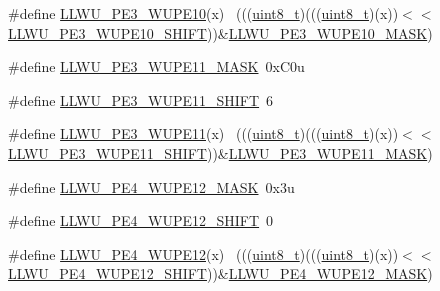 \begin{DoxyCompactItemize}
\#define \hyperlink{group___l_l_w_u___register___masks_ga08307363da95dd3aef24ec6c32a04f81}{L\+L\+W\+U\+\_\+\+P\+E3\+\_\+\+W\+U\+P\+E10}(x)                                          ~(((\hyperlink{_p_e___types_8h_aba7bc1797add20fe3efdf37ced1182c5}{uint8\+\_\+t})(((\hyperlink{_p_e___types_8h_aba7bc1797add20fe3efdf37ced1182c5}{uint8\+\_\+t})(x))$<$$<$\hyperlink{group___l_l_w_u___register___masks_ga1686c8515045158eeef3fc0c5df480d9}{L\+L\+W\+U\+\_\+\+P\+E3\+\_\+\+W\+U\+P\+E10\+\_\+\+S\+H\+I\+FT}))\&\hyperlink{group___l_l_w_u___register___masks_ga6d8e812233df26a72459712117996efa}{L\+L\+W\+U\+\_\+\+P\+E3\+\_\+\+W\+U\+P\+E10\+\_\+\+M\+A\+SK})
\item 
\#define \hyperlink{group___l_l_w_u___register___masks_gad46cfb926e4e6bbc0cba079fb07a2bfd}{L\+L\+W\+U\+\_\+\+P\+E3\+\_\+\+W\+U\+P\+E11\+\_\+\+M\+A\+SK}~0x\+C0u
\item 
\#define \hyperlink{group___l_l_w_u___register___masks_gad8a60b9eab4fe9a0c559bae94033ca1e}{L\+L\+W\+U\+\_\+\+P\+E3\+\_\+\+W\+U\+P\+E11\+\_\+\+S\+H\+I\+FT}~6
\item 
\#define \hyperlink{group___l_l_w_u___register___masks_ga04f71e0da1d8aa3f07fcab88cad7fb67}{L\+L\+W\+U\+\_\+\+P\+E3\+\_\+\+W\+U\+P\+E11}(x)                                          ~(((\hyperlink{_p_e___types_8h_aba7bc1797add20fe3efdf37ced1182c5}{uint8\+\_\+t})(((\hyperlink{_p_e___types_8h_aba7bc1797add20fe3efdf37ced1182c5}{uint8\+\_\+t})(x))$<$$<$\hyperlink{group___l_l_w_u___register___masks_gad8a60b9eab4fe9a0c559bae94033ca1e}{L\+L\+W\+U\+\_\+\+P\+E3\+\_\+\+W\+U\+P\+E11\+\_\+\+S\+H\+I\+FT}))\&\hyperlink{group___l_l_w_u___register___masks_gad46cfb926e4e6bbc0cba079fb07a2bfd}{L\+L\+W\+U\+\_\+\+P\+E3\+\_\+\+W\+U\+P\+E11\+\_\+\+M\+A\+SK})
\item 
\#define \hyperlink{group___l_l_w_u___register___masks_ga0d1b6351b58cc9fbf3099dc653754205}{L\+L\+W\+U\+\_\+\+P\+E4\+\_\+\+W\+U\+P\+E12\+\_\+\+M\+A\+SK}~0x3u
\item 
\#define \hyperlink{group___l_l_w_u___register___masks_gaddb0a17347a85705dc2c2975129a7942}{L\+L\+W\+U\+\_\+\+P\+E4\+\_\+\+W\+U\+P\+E12\+\_\+\+S\+H\+I\+FT}~0
\item 
\#define \hyperlink{group___l_l_w_u___register___masks_ga8e7cffacb80520d478d473836699ca90}{L\+L\+W\+U\+\_\+\+P\+E4\+\_\+\+W\+U\+P\+E12}(x)                                          ~(((\hyperlink{_p_e___types_8h_aba7bc1797add20fe3efdf37ced1182c5}{uint8\+\_\+t})(((\hyperlink{_p_e___types_8h_aba7bc1797add20fe3efdf37ced1182c5}{uint8\+\_\+t})(x))$<$$<$\hyperlink{group___l_l_w_u___register___masks_gaddb0a17347a85705dc2c2975129a7942}{L\+L\+W\+U\+\_\+\+P\+E4\+\_\+\+W\+U\+P\+E12\+\_\+\+S\+H\+I\+FT}))\&\hyperlink{group___l_l_w_u___register___masks_ga0d1b6351b58cc9fbf3099dc653754205}{L\+L\+W\+U\+\_\+\+P\+E4\+\_\+\+W\+U\+P\+E12\+\_\+\+M\+A\+SK})
$$
\end{DoxyCompactItemize}
